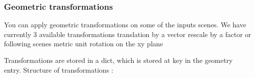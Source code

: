 \documentclass[letterpaper,10pt,english]{sphinxmanual}
\let\sphinxpxdimen\pdfpxdimen\else\newdimen\sphinxpxdimen
\begin{document}
\subsubsection{Geometric transformations}
\label{\detokenize{input_scenes:Geometric-transformations}}
\sphinxAtStartPar
You can apply geometric transformations on some of the inputs scenes. We have currently 3 available transformations \sphinxhyphen{} translation by a vector \sphinxhyphen{} rescale by a factor or following scenes metric unit \sphinxhyphen{} rotation on the xy plane

\sphinxAtStartPar
\sphinxincludegraphics[width=1333\sphinxpxdimen,height=512\sphinxpxdimen]{{transform_geo}.png}

\sphinxAtStartPar
Transformations are stored in a dict, which is stored at key  in the geometry entry. Structure of transformations :

\begin{sphinxVerbatim}[commandchars=\\\{\}]
  
         
         
          
          
\end{sphinxVerbatim}

\sphinxAtStartPar
{}
\end{document}
